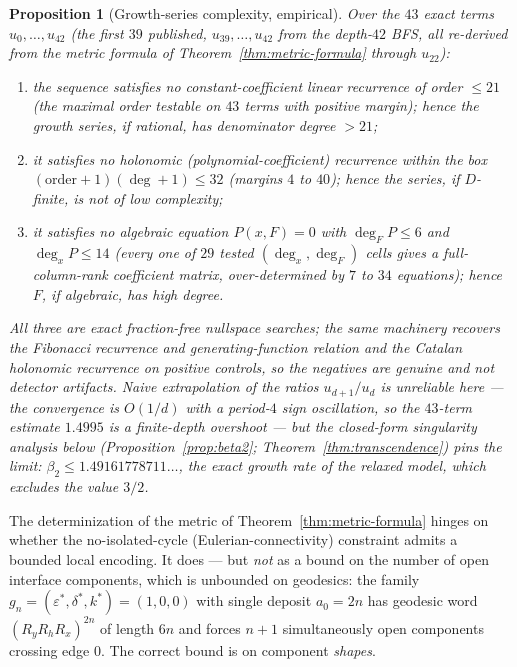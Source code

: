 \documentclass[11pt,a4paper]{article}
\newtheorem{proposition}[theorem]{Proposition}
\theoremstyle{remark}
\theoremstyle{plain}
\begin{document}
\begin{proposition}[Growth-series complexity, empirical]
\label{prop:growth-complexity}
Over the $43$ exact terms $u_0, \ldots, u_{42}$ (the first $39$
published, $u_{39}, \ldots, u_{42}$ from the depth-$42$ BFS, all
re-derived from the metric formula of
Theorem~\ref{thm:metric-formula} through $u_{22}$):
\begin{enumerate}[label=(\roman*),itemsep=0.1em]
\item the sequence satisfies \emph{no} constant-coefficient linear
recurrence of order $\le 21$ (the maximal order testable on $43$ terms
with positive margin); hence the growth series, if rational, has
denominator degree $> 21$;
\item it satisfies \emph{no} holonomic (polynomial-coefficient)
recurrence within the box $(\mathrm{order}+1)(\deg+1) \le 32$ (margins
$4$ to $40$); hence the series, if $D$-finite, is not of low complexity;
\item it satisfies \emph{no} algebraic equation $P(x, F) = 0$ with
$\deg_F P \le 6$ and $\deg_x P \le 14$ (every one of $29$ tested
$(\deg_x, \deg_F)$ cells gives a full-column-rank coefficient matrix,
over-determined by $7$ to $34$ equations); hence $F$, if algebraic, has
high degree.
\end{enumerate}
All three are exact fraction-free nullspace searches; the same machinery
recovers the Fibonacci recurrence and generating-function relation and
the Catalan holonomic recurrence on positive controls, so the negatives
are genuine and not detector artifacts.  Naive extrapolation of the
ratios $u_{d+1}/u_d$ is unreliable here --- the convergence is
$O(1/d)$ with a period-$4$ sign oscillation, so the $43$-term estimate
$1.4995$ is a finite-depth \emph{overshoot} --- but the closed-form
singularity analysis below
(Proposition~\ref{prop:beta2}; Theorem~\ref{thm:transcendence}) pins the
limit: $\beta_2 \le 1.49161778711\ldots$, the exact growth rate of the
relaxed model, which \emph{excludes} the value $3/2$.
\end{proposition}

The determinization of the metric of
Theorem~\ref{thm:metric-formula} hinges on whether the no-isolated-cycle
(Eulerian-connectivity) constraint admits a bounded local encoding.  It
does --- but \emph{not} as a bound on the number of open interface
components, which is unbounded on geodesics: the family
$g_n = (\varepsilon^*, \delta^*, k^*) = (1,0,0)$ with single deposit
$a_0 = 2n$ has geodesic word $(R_y R_h R_x)^{2n}$ of length $6n$ and forces
$n+1$ simultaneously open components crossing edge $0$.  The correct bound
is on component \emph{shapes}.
\end{document}
